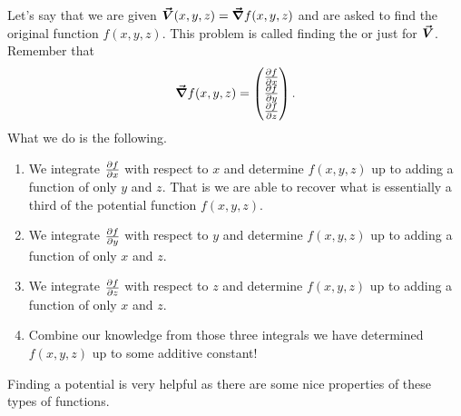                    	        Let's say that we are given $\boldsymbol{\vec{V}}(x,y,z)=\boldsymbol{\vec{\nabla}} f(x,y,z)$ and are asked to find the original function $f(x,y,z)$.  This problem is called finding the  or just  for $\boldsymbol{\vec{V}}$.  Remember that
                   	        \[
                   	        \boldsymbol{\vec{\nabla}} f(x,y,z) = \begin{pmatrix} \frac{\partial f}{\partial x} \\ \frac{\partial f}{\partial y} \\ \frac{\partial f}{\partial z} \end{pmatrix}.
                   	        \]
                   	        What we do is the following.
                   	        \begin{enumerate}[1.]
                   	            \item We integrate $\frac{\partial f}{\partial x}$ with respect to $x$ and determine $f(x,y,z)$ up to adding a function of only $y$ and $z$.  That is we are able to recover what is essentially a third of the potential function $f(x,y,z)$.
                   	            \item We integrate $\frac{\partial f}{\partial y}$ with respect to $y$ and determine $f(x,y,z)$ up to adding a function of only $x$ and $z$.  
                   	            \item We integrate $\frac{\partial f}{\partial z}$ with respect to $z$ and determine $f(x,y,z)$ up to adding a function of only $x$ and $z$.
                   	            \item Combine our knowledge from those three integrals we have determined $f(x,y,z)$ up to some additive constant!
                   	        \end{enumerate}
                   	        Finding a potential is very helpful as there are some nice properties of these types of functions.  
                   	        
